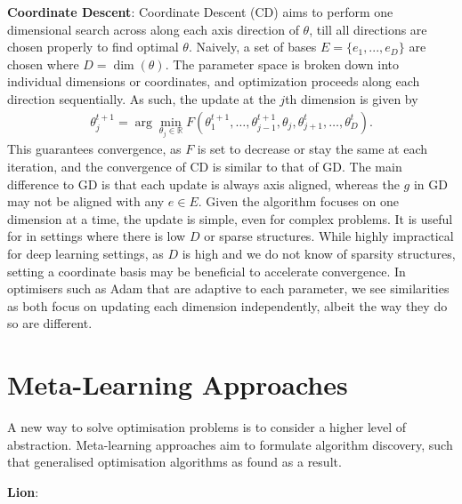 \textbf{Coordinate Descent}: Coordinate Descent (CD) aims to perform one dimensional search across along each axis direction of $\theta$, till all directions are chosen properly to find optimal $\theta$. Naively, a set of bases $E = \{e_1, ..., e_D \}$ are chosen where $D = \dim(\theta)$. The parameter space is broken down into individual dimensions or coordinates, and optimization proceeds along each direction sequentially. As such, the update at the $j$th dimension is given by
\begin{align}
\theta^{t+1}_j = \arg\min_{\theta_j \in \mathbb{R}} F(\theta^{t+1}_1, \dots, \theta^{t+1}_{j-1}, \theta_j, \theta^t_{j+1}, \dots, \theta^t_D).
\end{align}
This guarantees convergence, as $F$ is set to decrease or stay the same at each iteration, and the convergence of CD is similar to that of GD. The main difference to GD is that each update is always axis aligned, whereas the $g$ in GD may not be aligned with any $e \in E$. Given the algorithm focuses on one dimension at a time, the update is simple, even for complex problems. It is useful for in settings where there is low $D$ or sparse structures. While highly impractical for deep learning settings, as $D$ is high and we do not know of sparsity structures, setting a coordinate basis may be beneficial to accelerate convergence. In optimisers such as Adam that are adaptive to each parameter, we see similarities as both focus on updating each dimension independently, albeit the way they do so are different. 


\section{Meta-Learning Approaches}
A new way to solve optimisation problems is to consider a higher level of abstraction. Meta-learning approaches aim to formulate algorithm discovery, such that generalised optimisation algorithms as found as a result.

\textbf{Lion}: 





